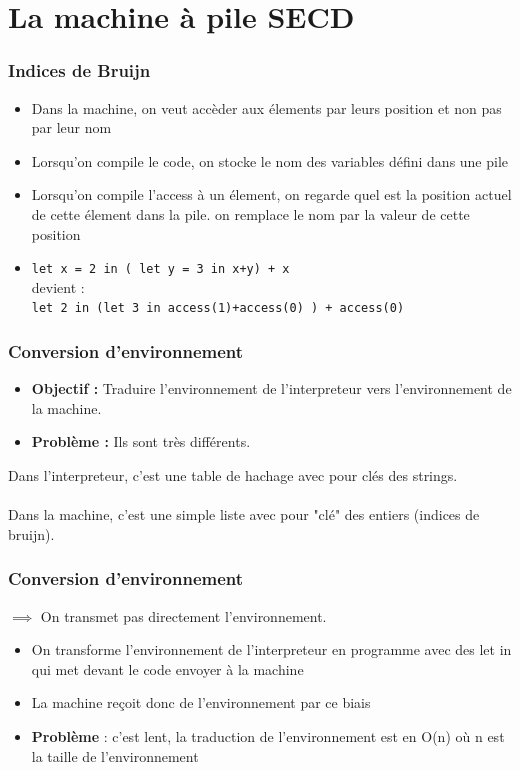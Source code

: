 \documentclass[xcolor=dvipsnames]{beamer}
\begin{document}
\section{La machine à pile SECD}

\begin{frame}
\frametitle{Indices de Bruijn}
  \begin{itemize}
    \item Dans la machine, on veut accèder aux élements par leurs position et non pas par leur nom \pause
    \item Lorsqu'on compile le code, on stocke le nom des variables défini dans une pile \pause
    \item Lorsqu'on compile l'access à un élement, on regarde quel est la position actuel de cette élement dans la pile. on remplace le nom par la valeur de cette position \pause
    \item \texttt{let x = 2 in ( let y = 3 in x+y) + x} \\ devient : \\
    \texttt{let 2 in (let 3 in access(1)+access(0) ) + access(0)}
   \end{itemize}
\end{frame}

\begin{frame}
\frametitle{Conversion d'environnement}
  \begin{itemize}
    \item \textbf{Objectif :} Traduire l'environnement de l'interpreteur vers l'environnement de la machine. \pause
    \item \textbf{Problème :} Ils sont très différents. \pause
  \end{itemize}
  Dans l'interpreteur, c'est une table de hachage avec pour clés des strings. \pause \\ ~ \\
  Dans la machine, c'est une simple liste avec pour "clé" des entiers (indices de bruijn).

\end{frame}

\begin{frame}
\frametitle{Conversion d'environnement}
  $\implies$ On transmet pas directement l'environnement. \pause
  \begin{itemize}
  \item On transforme l'environnement de l'interpreteur en programme avec des let in qui met devant le code envoyer à la machine \pause
  \item La machine reçoit donc de l'environnement par ce biais \pause
  \item \textbf{Problème} :  c'est lent, la traduction de l'environnement est en O(n) où n est la taille de l'environnement
  \end{itemize}
\end{frame}
\end{document}
